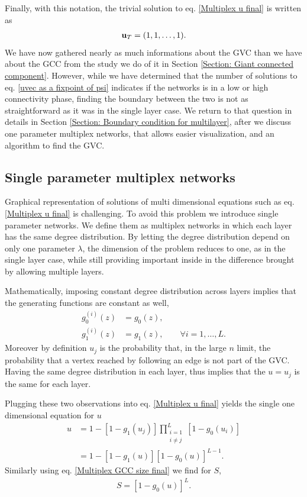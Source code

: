 \documentclass[
11pt, %
english, %
singlespacing, %
nolistspacing, %
liststotoc, %
headsepline, %
]{MastersDoctoralThesis} %
\begin{document}
Finally, with this notation, the trivial solution to eq. \eqref{Multiplex u final} is written as
\begin{align}
	\boldsymbol{\mathrm{u}}_T = (1, 1, \dots, 1). \label{Definition of multiplex trivial solution}
\end{align}
We have now gathered nearly as much informations about the GVC than we have about the GCC from the study we do of it in Section \ref{Section: Giant connected component}. However, while we have determined that the number of solutions to eq. \eqref{uvec as a fixpoint of psi} indicates if the networks is in a low or high connectivity phase, finding the boundary between the two is not as straightforward as it was in the single layer case. We return to that question in details in Section \ref{Section: Boundary condition for multilayer}, after we discuss one parameter multiplex networks, that allows easier visualization, and an algorithm to find the GVC.

\subsection{Single parameter multiplex networks}
\label{Section: Single parameter networks}

Graphical representation of solutions of multi dimensional equations such as eq. \eqref{Multiplex u final} is challenging. To avoid this problem we introduce single parameter networks. We define them as multiplex networks in which each layer has the same degree distribution. By letting the degree distribution depend on only one parameter $\lambda$, the dimension of the problem reduces to one, as in the single layer case, while still providing important inside in the difference brought by allowing multiple layers.

Mathematically, imposing constant degree distribution across layers implies that the generating functions are constant as well,
\begin{align}
	g^{(i)}_0(z) &= g_0(z), \\
	g^{(i)}_1(z) &= g_1(z), \qquad \forall i = 1, \dots, L.
\end{align}
Moreover by definition $u_j$ is the probability that, in the large $n$ limit, the probability that a vertex reached by following an edge is not part of the GVC. Having the same degree distribution in each layer, thus implies that the $u = u_j$ is the same for each layer.

Plugging these two observations into eq. \eqref{Multiplex u final} yields the single one dimensional equation for $u$
\begin{align}
	u &= 1 - \left[1 - g_1(u_j) \right] \prod_{\substack{i = 1 \\ i \neq j}}^{L}  \left[1 - g_0(u_i) \right] \\
		&= 1 - \left[1 - g_1(u) \right] \left[1 - g_0(u) \right]^{L - 1}. \label{Single parameter u final}
\end{align}
Similarly using eq. \eqref{Multiplex GCC size final} we find for $S$,
\begin{align}
	S = \left[1 - g_0(u) \right]^L. \label{Single parameter u final}
\end{align}
\end{document}
